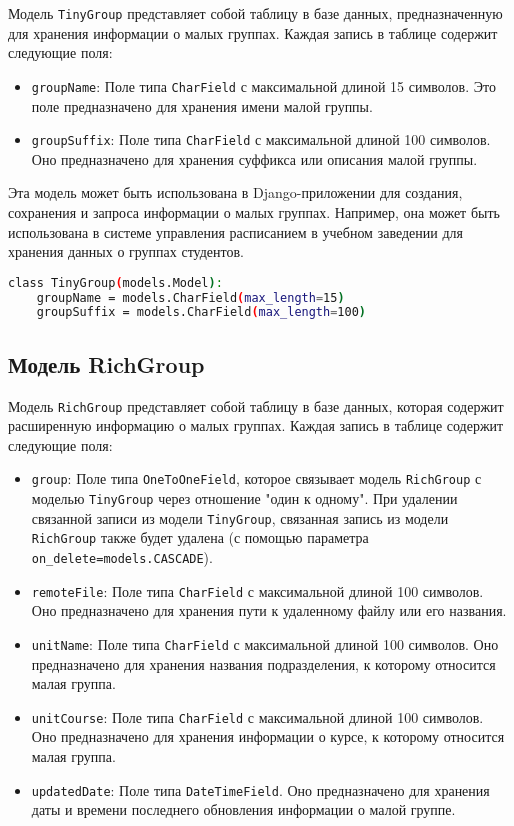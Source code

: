 Модель \texttt{TinyGroup} представляет собой таблицу в базе данных,
предназначенную для хранения информации о малых группах.
Каждая запись в таблице содержит следующие поля:

\begin{itemize}
    \item \texttt{groupName}: Поле типа \texttt{CharField}
		с максимальной длиной 15 символов.
		Это поле предназначено для хранения имени малой группы.
    \item \texttt{groupSuffix}: Поле типа \texttt{CharField}
	с максимальной длиной 100 символов.
	Оно предназначено для хранения суффикса или описания малой группы.
\end{itemize}

Эта модель может быть использована в Django-приложении для создания,
сохранения и запроса информации о малых группах.
Например, она может быть использована в системе управления расписанием
в учебном заведении для хранения данных о группах студентов.

\begin{lstlisting}[language=bash]
class TinyGroup(models.Model):
    groupName = models.CharField(max_length=15)
    groupSuffix = models.CharField(max_length=100)
\end{lstlisting}


\subsection{Модель RichGroup}

Модель \texttt{RichGroup} представляет собой таблицу в базе данных,
которая содержит расширенную информацию о малых группах.
Каждая запись в таблице содержит следующие поля:

\begin{itemize}
    \item \texttt{group}: Поле типа \texttt{OneToOneField},
		которое связывает модель \texttt{RichGroup}
		с моделью \texttt{TinyGroup} через отношение "один к одному".
		При удалении связанной записи из модели \texttt{TinyGroup},
		связанная запись из модели \texttt{RichGroup} также будет удалена
		(с помощью параметра \texttt{on\_delete=models.CASCADE}).
    \item \texttt{remoteFile}: Поле типа \texttt{CharField}
		с максимальной длиной 100 символов.
		Оно предназначено для хранения пути
		к удаленному файлу или его названия.
    \item \texttt{unitName}: Поле типа \texttt{CharField}
		с максимальной длиной 100 символов.
		Оно предназначено для хранения названия подразделения,
		к которому относится малая группа.
    \item \texttt{unitCourse}: Поле типа \texttt{CharField}
		с максимальной длиной 100 символов.
		Оно предназначено для хранения информации о курсе,
		к которому относится малая группа.
    \item \texttt{updatedDate}: Поле типа \texttt{DateTimeField}.
		Оно предназначено для хранения даты и времени последнего
		обновления информации о малой группе.
\end{itemize}

